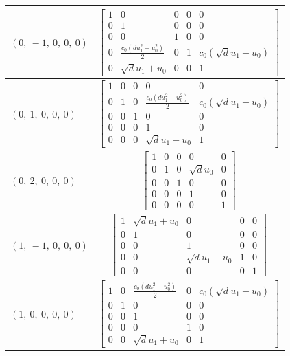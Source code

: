 \documentclass[11pt]{article}
\theoremstyle{definition}
\begin{document}
\begin{longtable}{|l|c|}
    \hline
    $\left( 0, \  -1, \  0, \  0, \  0\right)$ & ${\left[\begin{matrix}1 & 0 & 0 & 0 & 0\\0 & 1 & 0 & 0 & 0\\0 & 0 & 1 & 0 & 0\\0 & \frac{c_{0} \left(d u_{1}^{2} - u_{0}^{2}\right)}{2} & 0 & 1 & c_{0} \left(\sqrt{d} u_{1} - u_{0}\right)\\0 & \sqrt{d} u_{1} + u_{0} & 0 & 0 & 1\end{matrix}\right]}$ \\
    \hline
    $\left( 0, \  1, \  0, \  0, \  0\right)$ & ${\left[\begin{matrix}1 & 0 & 0 & 0 & 0\\0 & 1 & 0 & \frac{c_{0} \left(d u_{1}^{2} - u_{0}^{2}\right)}{2} & c_{0} \left(\sqrt{d} u_{1} - u_{0}\right)\\0 & 0 & 1 & 0 & 0\\0 & 0 & 0 & 1 & 0\\0 & 0 & 0 & \sqrt{d} u_{1} + u_{0} & 1\end{matrix}\right]}$ \\
    \hline
    $\left( 0, \  2, \  0, \  0, \  0\right)$ & ${\left[\begin{matrix}1 & 0 & 0 & 0 & 0\\0 & 1 & 0 & \sqrt{d} u_{0} & 0\\0 & 0 & 1 & 0 & 0\\0 & 0 & 0 & 1 & 0\\0 & 0 & 0 & 0 & 1\end{matrix}\right]}$ \\
    \hline
    $\left( 1, \  -1, \  0, \  0, \  0\right)$ & ${\left[\begin{matrix}1 & \sqrt{d} u_{1} + u_{0} & 0 & 0 & 0\\0 & 1 & 0 & 0 & 0\\0 & 0 & 1 & 0 & 0\\0 & 0 & \sqrt{d} u_{1} - u_{0} & 1 & 0\\0 & 0 & 0 & 0 & 1\end{matrix}\right]}$ \\
    \hline
    $\left( 1, \  0, \  0, \  0, \  0\right)$ & ${\left[\begin{matrix}1 & 0 & \frac{c_{0} \left(d u_{1}^{2} - u_{0}^{2}\right)}{2} & 0 & c_{0} \left(\sqrt{d} u_{1} - u_{0}\right)\\0 & 1 & 0 & 0 & 0\\0 & 0 & 1 & 0 & 0\\0 & 0 & 0 & 1 & 0\\0 & 0 & \sqrt{d} u_{1} + u_{0} & 0 & 1\end{matrix}\right]}$ \\

\end{longtable}
\end{document}
